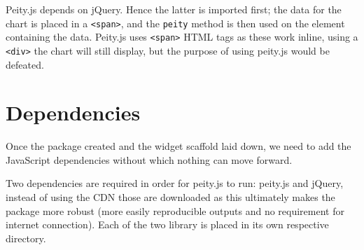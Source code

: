 \documentclass[
]{krantz}
\makeatletter
\newenvironment{Shaded}{\begin{snugshade}}{\end{snugshade}}
\newcommand{\AttributeTok}[1]{\textcolor[rgb]{0.61,0.61,0.61}{#1}}
\newcommand{\CommentTok}[1]{\textcolor[rgb]{0.37,0.37,0.37}{\textit{#1}}}
\newcommand{\DataTypeTok}[1]{\textcolor[rgb]{0.27,0.27,0.27}{#1}}
\newcommand{\KeywordTok}[1]{\textcolor[rgb]{0.27,0.27,0.27}{\textbf{#1}}}
\newcommand{\NormalTok}[1]{#1}
\newcommand{\OperatorTok}[1]{\textcolor[rgb]{0.43,0.43,0.43}{\textbf{#1}}}
\newcommand{\OtherTok}[1]{\textcolor[rgb]{0.37,0.37,0.37}{#1}}
\newcommand{\StringTok}[1]{\textcolor[rgb]{0.5,0.5,0.5}{#1}}
\newenvironment{kframe}{%
\medskip{}
\setlength{\fboxsep}{.8em}
 \def\at@end@of@kframe{}%
 \ifinner\ifhmode%
  \def\at@end@of@kframe{\end{minipage}}%
  \begin{minipage}{\columnwidth}%
 \fi\fi%
 \def\FrameCommand##1{\hskip\@totalleftmargin \hskip-\fboxsep
 \colorbox{shadecolor}{##1}\hskip-\fboxsep
     \hskip-\linewidth \hskip-\@totalleftmargin \hskip\columnwidth}%
 \MakeFramed {\advance\hsize-\width
   \@totalleftmargin\z@ \linewidth\hsize
   \@setminipage}}%
 {\par\unskip\endMakeFramed%
 \at@end@of@kframe}
\renewenvironment{Shaded}{\begin{kframe}}{\end{kframe}}
\makeatother
\begin{document}
\begin{Shaded}
\end{Shaded}

Peity.js depends on jQuery. Hence the latter is imported first; the data for the chart is placed in a \texttt{\textless{}span\textgreater{}}, and the \texttt{peity} method is then used on the element containing the data. Peity.js uses \texttt{\textless{}span\textgreater{}} HTML tags as these work inline, using a \texttt{\textless{}div\textgreater{}} the chart will still display, but the purpose of using peity.js would be defeated.

\hypertarget{widgets-realistic-deps}{%
\section{Dependencies}\label{widgets-realistic-deps}}

Once the package created and the widget scaffold laid down, we need to add the JavaScript dependencies without which nothing can move forward.

Two dependencies are required in order for peity.js to run: peity.js and jQuery, instead of using the CDN those are downloaded as this ultimately makes the package more robust (more easily reproducible outputs and no requirement for internet connection). Each of the two library is placed in its own respective directory.
\end{document}
